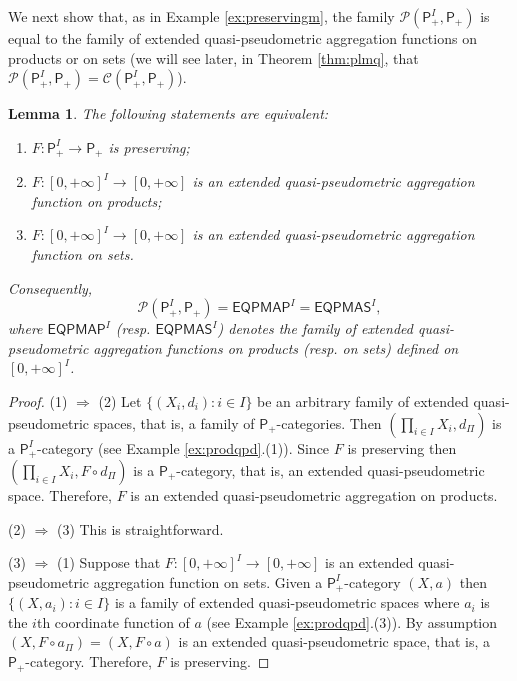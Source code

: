 \documentclass[11pt,a4paper]{amsart}
\newtheorem{lemma}[theorem]{Lemma}
\theoremstyle{definition}
\begin{document}
	We next show that, as in Example \ref{ex:preservingm}, the family $\mathscr{P}(\mathsf{P}_+^I,\mathsf{P}_+)$ is equal to the family of extended quasi-pseudometric aggregation functions on products or on sets (we will see later, in Theorem \ref{thm:plmq}, that $\mathscr{P}(\mathsf{P}_+^I,\mathsf{P}_+)=\mathscr{C}(\mathsf{P}_+^I,\mathsf{P}_+)$).
	
	
	
	\begin{lemma}\label{lem:preserving_eqpmaf}
		The following statements are equivalent:
		\begin{enumerate}
			\item $F:\mathsf{P}_+^I\to \mathsf{P}_+$ is preserving;
			\item $F:[0,+\infty]^I\to [0,+\infty]$ is an extended quasi-pseudometric aggregation function on products;
			\item $F:[0,+\infty]^I\to [0,+\infty]$ is an extended quasi-pseudometric aggregation function on sets.
		\end{enumerate}
		Consequently,
		$$\mathscr{P}(\mathsf{P}_+^I,\mathsf{P}_+)=\mathsf{EQPMAP}^I=\mathsf{EQPMAS}^I,$$
		where $\mathsf{EQPMAP}^I$ {\rm(}resp. $\mathsf{EQPMAS}^I${\rm)} denotes the family of extended quasi-pseudometric aggregation functions on products {\rm(}resp. on sets{\rm)} defined on $[0,+\infty]^I$.
	\end{lemma}
	
	\begin{proof}
		(1) $\Rightarrow$ (2) Let $\big\{(X_i,d_i):i\in I\big\}$ be an arbitrary family of extended quasi-pseudometric spaces, that is,  a family of $\mathsf{P}_+$-categories.  Then $(\prod_{i\in I} X_i, d_\Pi)$ is a $\mathsf{P}_+^I$-category (see Example \ref{ex:prodqpd}.(1)). Since $F$ is preserving then $(\prod_{i\in I} X_i,F\circ d_\Pi)$ is a $\mathsf{P}_+$-category, that is, an extended quasi-pseudometric space. Therefore, $F$ is an extended quasi-pseudometric aggregation on products.
		
		\noindent (2) $\Rightarrow$ (3) This is straightforward.
		
		\noindent (3) $\Rightarrow$ (1) Suppose that $F:[0,+\infty]^I\to [0,+\infty]$ is an extended quasi-pseudometric aggregation function on sets. Given a $\mathsf{P}_+^I$-category $(X,a)$ then $\big\{(X,a_i):i\in I\big\}$ is a family of extended quasi-pseudometric spaces where $a_i$ is the $i$th coordinate function of $a$ (see Example \ref{ex:prodqpd}.(3)). By assumption  $(X,F\circ a_\Pi)=(X,F\circ a)$ is an extended quasi-pseudometric space, that is, a  $\mathsf{P}_+$-category. Therefore, $F$ is preserving.
	\end{proof}
	
\end{document}
